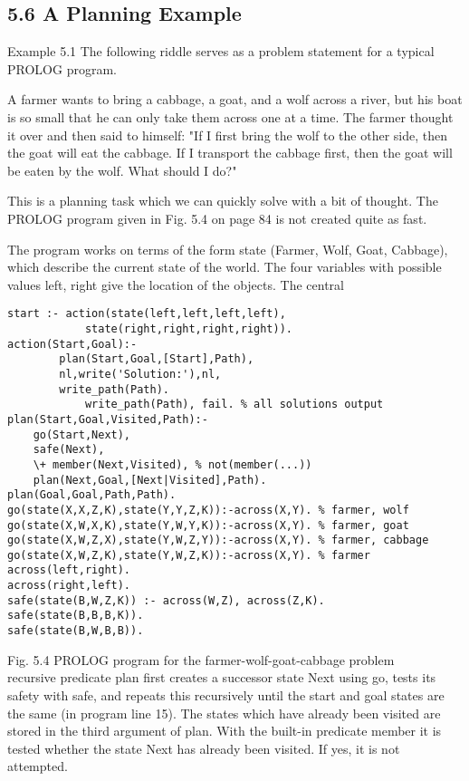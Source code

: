 \documentclass[10pt]{article}
\begin{document}
\subsection*{5.6 A Planning Example}
Example 5.1 The following riddle serves as a problem statement for a typical PROLOG program.

A farmer wants to bring a cabbage, a goat, and a wolf across a river, but his boat is so small that he can only take them across one at a time. The farmer thought it over and then said to himself: "If I first bring the wolf to the other side, then the goat will eat the cabbage. If I transport the cabbage first, then the goat will be eaten by the wolf. What should I do?"

This is a planning task which we can quickly solve with a bit of thought. The PROLOG program given in Fig. 5.4 on page 84 is not created quite as fast.

The program works on terms of the form state (Farmer, Wolf, Goat, Cabbage), which describe the current state of the world. The four variables with possible values left, right give the location of the objects. The central

\begin{verbatim}
start :- action(state(left,left,left,left),
            state(right,right,right,right)).
action(Start,Goal):-
        plan(Start,Goal,[Start],Path),
        nl,write('Solution:'),nl,
        write_path(Path).
            write_path(Path), fail. % all solutions output
plan(Start,Goal,Visited,Path):-
    go(Start,Next),
    safe(Next),
    \+ member(Next,Visited), % not(member(...))
    plan(Next,Goal,[Next|Visited],Path).
plan(Goal,Goal,Path,Path).
go(state(X,X,Z,K),state(Y,Y,Z,K)):-across(X,Y). % farmer, wolf
go(state(X,W,X,K),state(Y,W,Y,K)):-across(X,Y). % farmer, goat
go(state(X,W,Z,X),state(Y,W,Z,Y)):-across(X,Y). % farmer, cabbage
go(state(X,W,Z,K),state(Y,W,Z,K)):-across(X,Y). % farmer
across(left,right).
across(right,left).
safe(state(B,W,Z,K)) :- across(W,Z), across(Z,K).
safe(state(B,B,B,K)).
safe(state(B,W,B,B)).
\end{verbatim}

Fig. 5.4 PROLOG program for the farmer-wolf-goat-cabbage problem\\
recursive predicate plan first creates a successor state Next using go, tests its safety with safe, and repeats this recursively until the start and goal states are the same (in program line 15). The states which have already been visited are stored in the third argument of plan. With the built-in predicate member it is tested whether the state Next has already been visited. If yes, it is not attempted.
\end{document}
